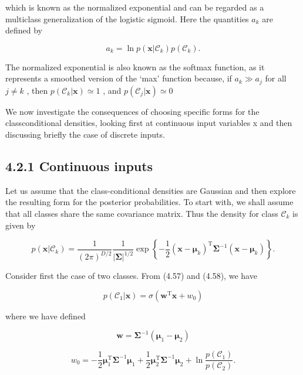 \documentclass[
  10
]{article}
\begin{document}
which is known as the normalized exponential and can be regarded as a
multiclass generalization of the logistic sigmoid. Here the quantities
\(a _ { k }\) are defined by

\[
a _ {k} = \ln p (\mathbf {x} | \mathcal {C} _ {k}) p (\mathcal {C} _ {k}).\tag{4.63}
\]

The normalized exponential is also known as the softmax function, as it
represents a smoothed version of the `max' function because, if
\(a _ { k } \gg a _ { j }\) for all \(j \neq k\) , then
\(p ( \mathcal { C } _ { k } | \mathbf { x } ) \simeq 1\) , and
\(p ( \mathcal { C } _ { j } | \mathbf { x } ) \simeq 0\)

We now investigate the consequences of choosing specific forms for the
classconditional densities, looking first at continuous input variables
x and then discussing briefly the case of discrete inputs.

\subsection{4.2.1 Continuous inputs}\label{continuous-inputs}

Let us assume that the class-conditional densities are Gaussian and then
explore the resulting form for the posterior probabilities. To start
with, we shall assume that all classes share the same covariance matrix.
Thus the density for class \(\mathcal { C } _ { k }\) is given by

\[
p (\mathbf {x} | \mathcal {C} _ {k}) = \frac {1}{(2 \pi) ^ {D / 2}} \frac {1}{| \boldsymbol {\Sigma} | ^ {1 / 2}} \exp \left\{- \frac {1}{2} (\mathbf {x} - \boldsymbol {\mu} _ {k}) ^ {\mathrm{T}} \boldsymbol {\Sigma} ^ {- 1} (\mathbf {x} - \boldsymbol {\mu} _ {k}) \right\}.\tag{4.64}
\]

Consider first the case of two classes. From (4.57) and (4.58), we have

\[
p (\mathcal {C} _ {1} | \mathbf {x}) = \sigma (\mathbf {w} ^ {\mathrm{T}} \mathbf {x} + w _ {0})\tag{4.65}
\]

where we have defined

\[
\mathbf {w} = \boldsymbol {\Sigma} ^ {- 1} (\boldsymbol {\mu} _ {1} - \boldsymbol {\mu} _ {2})\tag{4.66}
\]

\[
w _ {0} = - \frac {1}{2} \boldsymbol {\mu} _ {1} ^ {\mathrm{T}} \boldsymbol {\Sigma} ^ {- 1} \boldsymbol {\mu} _ {1} + \frac {1}{2} \boldsymbol {\mu} _ {2} ^ {\mathrm{T}} \boldsymbol {\Sigma} ^ {- 1} \boldsymbol {\mu} _ {2} + \ln \frac {p (\mathcal {C} _ {1})}{p (\mathcal {C} _ {2})}.\tag{4.67}
\]
\end{document}
